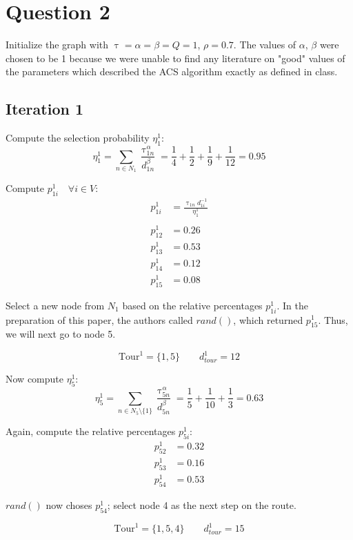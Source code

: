 \documentclass[a4paper]{article}
\begin{document}
\section{Question 2}

Initialize the graph with $\uptau = \alpha = \beta = Q = 1$, $\rho = 0.7$. The values of $\alpha$, $\beta$ were chosen to be 1 because we were unable to find any literature on "good" values of the parameters which described the ACS algorithm exactly as defined in class.

\subsection{Iteration 1}

Compute the selection probability $\eta_1^1$:
$$
\eta_1^1 = \sum_{n \in N_1} \frac{\uptau_{1n}^\alpha}{d_{1n}^\beta} = \frac{1}{4} + \frac{1}{2} + \frac{1}{9} + \frac{1}{12} = 0.95
$$

Compute $p_{1i}^1 \quad \forall i \in V$:
\begin{align*}
p_{1i}^1 &= \frac{\uptau_{1n}d_{1i}^{-1}}{\eta_1^1} \\
\\
p_{12}^1 &= 0.26 \\
p_{13}^1 &= 0.53 \\
p_{14}^1 &= 0.12 \\
p_{15}^1 &= 0.08
\end{align*}

Select a new node from $N_1$ based on the relative percentages $p_{1i}^1$. In the preparation of this paper, the authors called $rand()$, which returned $p_{15}^1$. Thus, we will next go to node 5.

$$
\text{Tour}^1 = \{1, 5\} \qquad 
d_{tour}^1 = 12
$$

Now compute $\eta_5^1$:
$$
\eta_5^1 = \sum_{n \in N_5 \setminus \{1\}} \frac{\uptau_{5n}^\alpha}{d_{5n}^\beta} = \frac{1}{5} + \frac{1}{10} + \frac{1}{3} = 0.63
$$

Again, compute the relative percentages $p_{5i}^1$:
\begin{align*}
p_{52}^1 &= 0.32 \\
p_{53}^1 &= 0.16 \\
p_{54}^1 &= 0.53
\end{align*}

$rand()$ now choses $p_{54}^1$; select node 4 as the next step on the route.

$$
\text{Tour}^1 = \{1, 5, 4\} \qquad 
d_{tour}^1 = 15
$$
\end{document}
